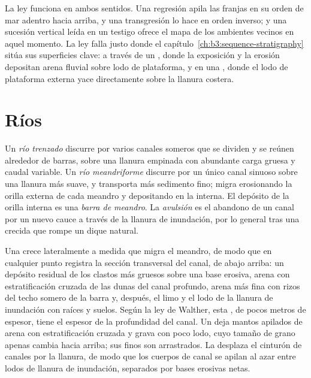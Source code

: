La ley funciona en ambos sentidos. Una regresión apila las franjas en su orden de mar adentro
hacia arriba, y una transgresión lo hace en orden inverso; y una sucesión vertical leída
en un testigo ofrece el mapa de los ambientes vecinos en aquel momento. La ley falla
justo donde el capítulo~\ref{ch:b3:sequence-stratigraphy} sitúa sus superficies clave:
a través de un , donde la exposición y la erosión depositan arena fluvial sobre
lodo de plataforma, y en una , donde el lodo de plataforma externa yace directamente sobre
la llanura costera.

\section{Ríos}\label{sec:b3:facies-models:rivers}

\begin{definition}\label{def:b3:facies-models:rivers}
Un \emph{río trenzado} discurre por varios canales someros
que se dividen y se reúnen alrededor de barras, sobre una llanura empinada con abundante
carga gruesa y caudal variable. Un \emph{río meandriforme}
discurre por un único canal sinuoso sobre una llanura más suave, y transporta más
sedimento fino; migra erosionando la orilla externa de cada meandro y
depositando en la interna. El depósito de la orilla interna es una \emph{barra
de meandro}. La \emph{avulsión} es el abandono de
un canal por un nuevo cauce a través de la llanura de inundación, por lo general
tras una crecida que rompe un dique natural.
\end{definition}

Una  crece lateralmente a medida que migra el meandro, de modo que en cualquier punto registra
la sección transversal del canal, de abajo arriba: un depósito residual de los clastos más
gruesos sobre una base erosiva, arena con estratificación cruzada de las dunas del canal profundo,
arena más fina con rizos del techo somero de la barra y, después, el
limo y el lodo de la llanura de inundación con raíces y suelos. Según la ley de Walther, esta
, de pocos metros de espesor, tiene el espesor de la
profundidad del canal. Un  deja mantos apilados de arena con estratificación cruzada
y grava con poco lodo, cuyo tamaño de grano apenas cambia hacia arriba; sus finos
son arrastrados. La  desplaza el cinturón de canales por la llanura, de modo que
los cuerpos de canal se apilan al azar entre lodos de llanura de inundación,
separados por bases erosivas netas.

